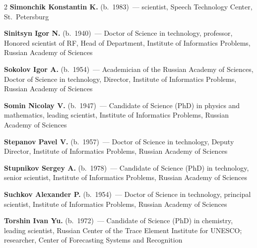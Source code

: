 \begin{multicols}{2}
\noindent
\textbf{Simonchik Konstantin K.} (b.\ 1983)~--- scientist, 
 Speech Technology Center, St.~Petersburg

\vspace*{4pt}

\noindent
\textbf{Sinitsyn Igor N.} (b.\ 1940)~--- Doctor of Science in technology,
professor, Honored scientist  of RF,
Head of Department, Institute of Informatics Problems,  Russian Academy of Sciences

\pagebreak

\noindent 
\textbf{Sokolov Igor A.} (b.\ 1954)~--- Academician of the Russian Academy of Sciences,
Doctor of Science in technology, Director,
Institute of Informatics Problems,  Russian Academy of Sciences

\vspace*{4pt}

\def\leftfootline{\small{\textbf{\thepage}
\hfill ����������� � �� ����������\ \ \ ⮬~6\ \ \ ����~1\ \ \ 2012}
}%
 \def\rightfootline{\small{����������� � �� ����������\ \ \ ⮬~6\ \ \ ����~1\ \ \ 2012
\hfill \textbf{\thepage}}}

\noindent
\textbf{Somin Nicolay V.} (b.\ 1947)~--- Candidate of Science (PhD) in physics and mathematics, 
leading scientist, Institute of Informatics Problems, Russian Academy of Sciences

\vspace*{4pt}


\noindent
\textbf{Stepanov Pavel V.} (b.\ 1957)~--- Doctor of Science in technology, 
Deputy Director, Institute of Informatics Problems, Russian Academy of Sciences

\vspace*{4pt}


\noindent
\textbf{Stupnikov Sergey A.} (b.\ 1978)~--- Candidate of Science (PhD) in technology, 
senior scientist, Institute of Informatics Problems, Russian Academy of Sciences 

 \vspace*{4pt}

\noindent
\textbf{Suchkov Alexander P.} (b.\ 1954)~--- Doctor of Science in technology, 
principal scientist, Institute of Informatics Problems, Russian Academy of Sciences

\columnbreak

\noindent
\textbf{Torshin Ivan Yu.} (b.\ 1972)~--- Candidate of Science (PhD)
in chemistry, leading scientist, Russian Center of the 
Trace Element Institute for \mbox{UNESCO}; researcher, 
Center of Forecasting Systems and Recognition



\end{multicols}
